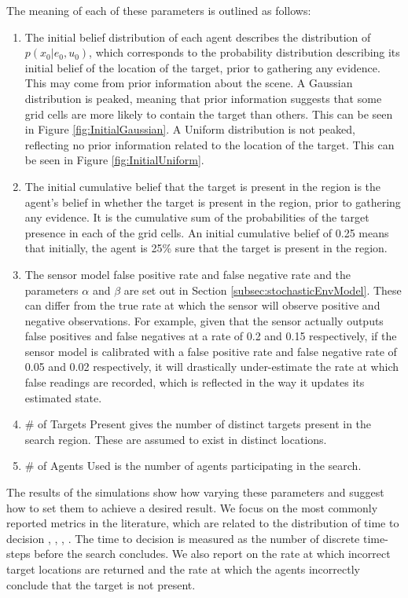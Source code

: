 The meaning of each of these parameters is outlined as follows:
\begin{enumerate}
    \item The initial belief distribution of each agent describes the distribution of $p(x_0 | e_0, u_0)$, which corresponds to the probability distribution describing its initial belief of the location of the target, prior to gathering any evidence. This may come from prior information about the scene. A Gaussian distribution is peaked, meaning that prior information suggests that some grid cells are more likely to contain the target than others. This can be seen in Figure \ref{fig:InitialGaussian}. A Uniform distribution is not peaked, reflecting no prior information related to the location of the target. This can be seen in Figure \ref{fig:InitialUniform}.
    \item The initial cumulative belief that the target is present in the region is the agent's belief in whether the target is present in the region, prior to gathering any evidence. It is the cumulative sum of the probabilities of the target presence in each of the grid cells. An initial cumulative belief of 0.25 means that initially, the agent is 25\% sure that the target is present in the region. 
    \item The sensor model false positive rate and false negative rate and the parameters $\alpha$ and $\beta$ are set out in Section \ref{subsec:stochasticEnvModel}. These can differ from the true rate at which the sensor will observe positive and negative observations. For example, given that the sensor actually outputs false positives and false negatives at a rate of 0.2 and 0.15 respectively, if the sensor model is calibrated with a false positive rate and false negative rate of 0.05 and 0.02 respectively, it will drastically under-estimate the rate at which false readings are recorded, which is reflected in the way it updates its estimated state.
    \item \# of Targets Present gives the number of distinct targets present in the search region. These are assumed to exist in distinct locations.
    \item \# of Agents Used is the number of agents participating in the search.
\end{enumerate}
The results of the simulations show how varying these parameters and suggest how to set them to achieve a desired result. We focus on the most commonly reported metrics in the literature, which are related to the distribution of time to decision \cite{Chung2012AnalysisStrategies}, \cite{Waharte2010ProbabilisticUAVs}, \cite{Waharte2010SupportingUAVs}, \cite{Lau2007OptimalEnvironments}. The time to decision is measured as the number of discrete time-steps before the search concludes. We also report on the rate at which incorrect target locations are returned and the rate at which the agents incorrectly conclude that the target is not present. 

